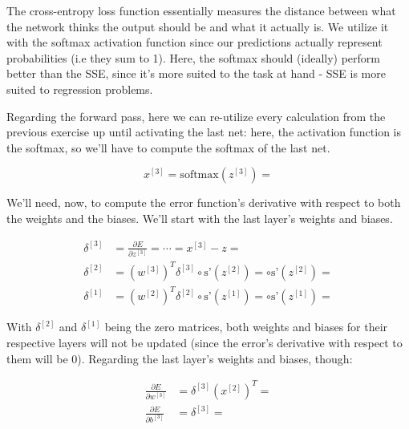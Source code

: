 \documentclass[12pt]{article}
\begin{document}
\begin{enumerate}[leftmargin=\labelsep]
  The cross-entropy loss function essentially measures the distance between what the
  network thinks the output should be and what it actually is. We utilize it with
  the softmax activation function since our predictions actually represent probabilities
  (i.e they sum to 1). Here, the softmax should (ideally) perform better than the SSE,
  since it's more suited to the task at hand - SSE is more suited to regression problems.

  Regarding the forward pass, here we can re-utilize every calculation from the previous
  exercise up until activating the last net: here, the activation function is the softmax,
  so we'll have to compute the softmax of the last net.

  \begin{equation*}
    x^{[3]} = \text{softmax}(z^{[3]}) = 
  \end{equation*}

  We'll need, now, to compute the error function's derivative with respect to both
  the weights and the biases. We'll start with the last layer's weights and biases.

  \begin{equation*}
    \begin{aligned}
      \delta^{[3]} & = \frac{\partial E}{\partial z^{[3]}} = \cdots = x^{[3]} - z =                                                        \\
      \delta^{[2]} & = (w^{[3]})^T \delta^{[3]} \circ \text{s'}(z^{[2]}) =  \circ \text{s'}(z^{[2]}) =  \\
      \delta^{[1]} & = (w^{[2]})^T \delta^{[2]} \circ \text{s'}(z^{[1]}) =  \circ \text{s'}(z^{[1]}) = 
    \end{aligned}
  \end{equation*}

  With $\delta^{[2]}$ and $\delta^{[1]}$ being the zero matrices, both weights and
  biases for their respective layers will not be updated (since the error's derivative
  with respect to them will be 0). Regarding the last layer's weights and biases, though:

  \begin{equation*}
    \begin{aligned}
      \frac{\partial E}{\partial w^{[3]}} & = \delta^{[3]} (x^{[2]})^T =                           \\
      \frac{\partial E}{\partial b^{[3]}} & = \delta^{[3]}  = 
    \end{aligned}
  \end{equation*}


\end{enumerate}
\end{document}
